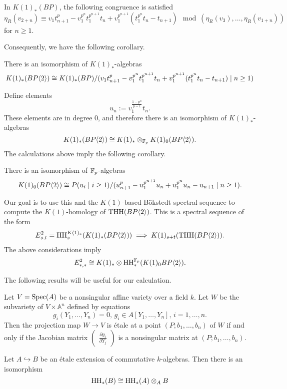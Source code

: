 \begin{lem}
	In $K(1)_*(BP)$, the following congruence is satisfied
	\[
	\eta_R(v_{2+n})\equiv v_1t_{n+1}^p-v_1^{p^n}t_1^{p^{n+1}}t_n+v_1^{p^{n+1}}(t_1^{p^n}t_n-t_{n+1})  \mod(\eta_R(v_3), \ldots, \eta_R(v_{1+n}))
	\]
	for $n\geq 1$.
\end{lem}

Consequently, we have the following corollary. 

\begin{cor}
	There is an isomorphism of $K(1)_*$-algebras
	\[
	K(1)_*(BP\langle 2 \rangle)\cong K(1)_*(BP)/(v_1t_{n+1}^p-v_1^{p^n}t_1^{p^{n+1}}t_n+v_1^{p^{n+1}}(t_1^{p^n}t_n-t_{n+1}) \mid n\geq 1)
	\]
\end{cor}

Define elements
\[ u_n:=v_1^{\frac{1-p^n}{p-1}}t_n.\] 
These elements are in degree 0, and therefore there is an isomorphism of $K(1)_*$-algebras
\[
K(1)_*(BP\langle 2 \rangle)\cong K(1)_*\otimes_{\mathbb{F}_p}K(1)_0(BP\langle 2 \rangle).
\]
The calculations above imply the following corollary.

\begin{cor}
	There is an isomorphism of $\mathbb{F}_p$-algebras
	\[
	K(1)_0 (BP\langle 2 \rangle) \cong P(u_i\mid i\geq 1)/(u_{n+1}^p-u_1^{p^{n+1}}u_n+u_1^{p^n}u_n-u_{n+1}\mid n\geq 1).
	\]
\end{cor}

Our goal is to use this and the $K(1)$-based B\"okstedt spectral sequence to compute the $K(1)$-homology of $\operatorname{THH}(BP\langle 2 \rangle)$. This is a spectral sequence of the form 
\[
E^2_{s,t}= \operatorname{HH}^{K(1)_*}_s(K(1)_*(BP\langle 2 \rangle))\implies K(1)_{s+t}(\operatorname{THH}(BP\langle 2 \rangle)).
\]
The above considerations imply
\[
E_{*,*}^2\cong K(1)_*\otimes \operatorname{HH}_*^{\mathbb{F}_p}(K(1)_0BP\langle 2 \rangle). 
\]

The following results will be useful for our calculation.

\begin{lem}\label{lem:etale}
	Let $V = \operatorname{Spec}(A)$ be a nonsingular affine variety over a field $k$. Let $W$ be the subvariety of $V\times \mathbb{A}^n$ defined by equations
	\[
	g_i(Y_1, \ldots, Y_n)=0, \, g_i\in A[Y_1, \ldots, Y_n],\, i=1,\ldots , n.
	\]
	Then the projection map $W\to V$ is \'etale at a point $(P;b_1, \ldots, b_n)$ of $W$ if and only if the Jacobian matrix $\begin{pmatrix}
		\frac{\partial g_i}{\partial Y_j}
	\end{pmatrix}$ is a nonsingular matrix at $(P; b_1, \ldots , b_n)$.
\end{lem} 

\begin{thm}\label{etaledescent}
	Let $A\hookrightarrow B$ be an \'etale extension of commutative $k$-algebras. Then there is an isomorphism
	\[
	\operatorname{HH}_*(B)\cong \operatorname{HH}_*(A)\otimes_A B
	\]
\end{thm}


